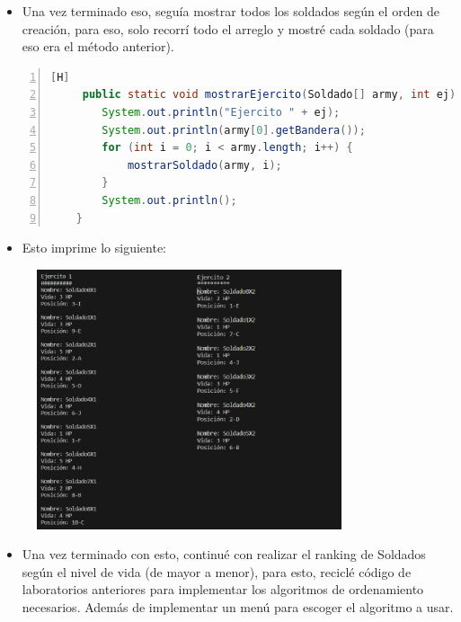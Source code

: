 \documentclass{article}
\begin{document}
	\begin{itemize}	
		\item Una vez terminado eso, seguía mostrar todos los soldados según el orden de creación, para eso, solo recorrí todo el arreglo y mostré cada soldado (para eso era el método anterior).
	\end{itemize}
	\begin{lstlisting}[language=java,caption={Mostrar ejército}, numbers=left][H]
	 public static void mostrarEjercito(Soldado[] army, int ej) {
        System.out.println("Ejercito " + ej);
        System.out.println(army[0].getBandera());
        for (int i = 0; i < army.length; i++) {
            mostrarSoldado(army, i);
        }
        System.out.println();
    }
	\end{lstlisting}
	\begin{itemize}
		\item Esto imprime lo siguiente:
	\end{itemize}
	\begin{figure}[H]
		\centering
	\includegraphics[width=0.8\textwidth,keepaspectratio]{img/captura3.png}
	\end{figure}
	\begin{itemize}	
		\item Una vez terminado con esto, continué con realizar el ranking de Soldados según el nivel de vida (de mayor a menor), para esto, reciclé código de laboratorios anteriores para implementar los algoritmos de ordenamiento necesarios. Además de implementar un menú para escoger el algoritmo a usar.
	\end{itemize}
	
\end{document}
